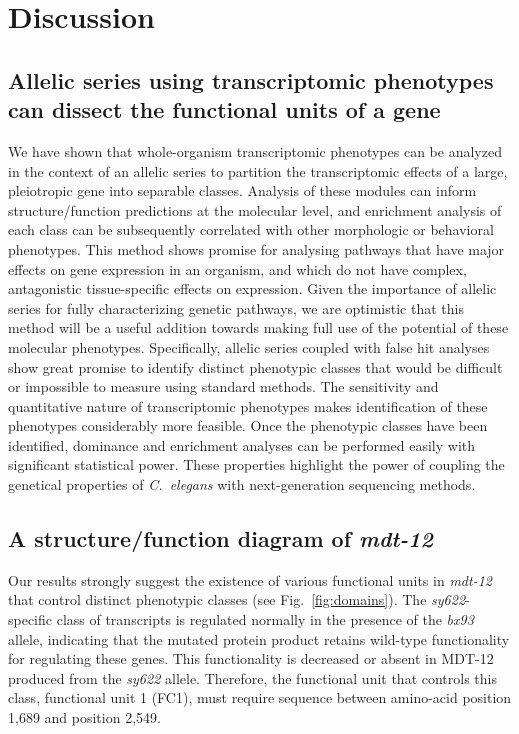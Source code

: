\documentclass[10pt, twocolumn]{article}
\newcommand{\cel}{\emph{C.~elegans}}
\newcommand{\gene}[1]{\mbox{\emph{#1}}}
\newcommand{\protein}[1]{\mbox{\uppercase{#1}}}
\newcommand{\dpy}{\gene{mdt-12}}
\begin{document}
\section*{Discussion}
\label{sec:conclusions}
\subsection*{Allelic series using transcriptomic phenotypes can dissect the
             functional units of a gene}
We have shown that whole-organism transcriptomic phenotypes can be analyzed in
the context of an allelic series to partition the transcriptomic effects of a
large, pleiotropic gene into separable classes. Analysis of these modules can
inform structure/function predictions at the molecular level, and enrichment
analysis of each class can be subsequently correlated with other morphologic or
behavioral phenotypes. This method shows promise for analysing pathways that
have major effects on gene expression in an organism, and which do not have
complex, antagonistic tissue-specific effects on expression. Given the
importance of allelic series for fully characterizing genetic pathways, we are
optimistic that this method will be a useful addition towards making full use of
the potential of these molecular phenotypes. Specifically, allelic series
coupled with false hit analyses show great promise to identify distinct
phenotypic classes that would be difficult or impossible to measure using
standard methods. The sensitivity and quantitative nature of transcriptomic
phenotypes makes identification of these phenotypes considerably more feasible.
Once the phenotypic classes have been identified, dominance and enrichment
analyses can be performed easily with significant statistical power. These
properties highlight the power of coupling the genetical properties of \cel{}
with next-generation sequencing methods.

\subsection*{A structure/function diagram of \dpy{}}
Our results strongly suggest the existence of various functional units in \dpy{}
that control distinct phenotypic classes (see Fig.~\ref{fig:domains}). The
\emph{sy622}-specific class of transcripts is regulated normally in the presence
of the \emph{bx93} allele, indicating that the mutated protein product retains
wild-type functionality for regulating these genes. This functionality is
decreased or absent in \protein{mdt-12} produced from the \emph{sy622} allele.
Therefore, the functional unit that controls this class, functional unit 1 (FC1),
must require sequence between amino-acid position 1,689 and position 2,549.
\end{document}
